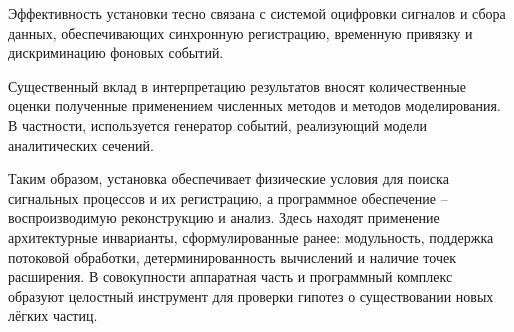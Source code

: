 Эффективность установки тесно связана с системой оцифровки сигналов
и сбора данных, обеспечивающих синхронную регистрацию, временную
привязку и дискриминацию фоновых событий.

Существенный вклад в интерпретацию результатов вносят количественные
оценки полученные применением численных методов и методов
моделирования. В частности, используется генератор
событий, реализующий модели аналитических сечений.

Таким образом, установка обеспечивает физические условия
для поиска сигнальных процессов и их регистрацию, а
программное обеспечение -- воспроизводимую реконструкцию и
анализ. Здесь находят применение архитектурные инварианты,
сформулированные ранее: модульность, поддержка потоковой
обработки, детерминированность вычислений и наличие
точек расширения. В совокупности аппаратная часть
и программный комплекс образуют целостный инструмент
для проверки гипотез о существовании новых лёгких частиц.

%

